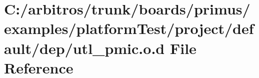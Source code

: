 \hypertarget{platform_test_2project_2default_2dep_2utl__pmic_8o_8d}{\section{C\-:/arbitros/trunk/boards/primus/examples/platform\-Test/project/default/dep/utl\-\_\-pmic.o.\-d File Reference}
\label{platform_test_2project_2default_2dep_2utl__pmic_8o_8d}
}
